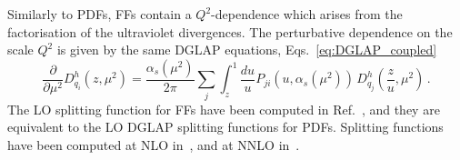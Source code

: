 Similarly to PDFs, FFs contain a $Q^2$-dependence which arises from the factorisation of the ultraviolet divergences. The perturbative dependence on the scale $Q^2$ is given by the same DGLAP equations, Eqs.~\eqref{eq:DGLAP_coupled}
\begin{equation}
  \frac{\partial}{\partial \mu^2} D_{q_i}^{h} (z,\mu^2) = \frac{\alpha_s(\mu^2)}{2\pi} \sum_{j} \int_{z}^{1} \frac{du}{u} P_{ji}\left( u, \alpha_s(\mu^2) \right) \, D_{q_j}^h \left( \frac{z}{u}, \mu^2 \right) \,.
\end{equation}
The LO splitting function for FFs have been computed in Ref.~\cite{Owens:1978qz, Uematsu:1978yw, Georgi:1977mg}, and they are equivalent to the LO DGLAP splitting functions for PDFs. Splitting functions have been computed at NLO in~\cite{Curci:1980uw, Furmanski:1980cm}, and at NNLO in~\cite{Mitov:2006ic, Moch:2007tx, Almasy:2011eq}.